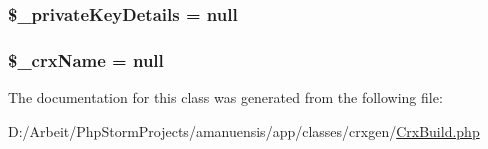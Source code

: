 \subsubsection[{\$\+\_\+private\+Key\+Details}]{\setlength{\rightskip}{0pt plus 5cm}\$\+\_\+private\+Key\+Details = null\hspace{0.3cm}{\ttfamily [private]}}\label{a00021_a05915f5862071215b68df0e6aea1062e}
\hypertarget{a00021_ab55336ecdfbb6e7472f129ff288ab467}{}
\subsubsection[{\$\+\_\+crx\+Name}]{\setlength{\rightskip}{0pt plus 5cm}\$\+\_\+crx\+Name = null\hspace{0.3cm}{\ttfamily [private]}}\label{a00021_ab55336ecdfbb6e7472f129ff288ab467}


The documentation for this class was generated from the following file\+:\begin{DoxyCompactItemize}
\item 
D\+:/\+Arbeit/\+Php\+Storm\+Projects/amanuensis/app/classes/crxgen/\hyperlink{a00087}{Crx\+Build.\+php}\end{DoxyCompactItemize}
